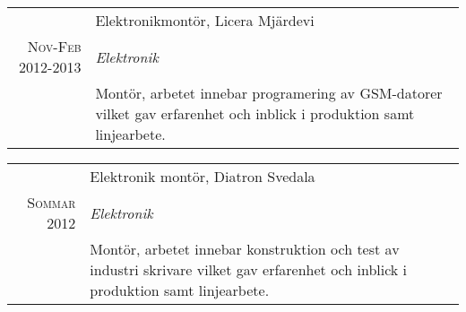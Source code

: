 \documentclass[a4paper,10pt]{article}
\begin{document}
\begin{tabular}{r|p{11cm}}
    
    & Elektronikmontör, Licera Mjärdevi \\         
    \textsc{Nov-Feb 2012-2013} & \emph{Elektronik}\\
    & \footnotesize{Montör, arbetet innebar programering av GSM-datorer vilket gav erfarenhet och inblick i produktion samt linjearbete.}\\
    
    \end{tabular}
    \newpage
    \begin{tabular}{r|p{11cm}}
    
    & Elektronik montör, Diatron Svedala \\         
    \textsc{Sommar 2012} & \emph{Elektronik}\\
    & \footnotesize{Montör, arbetet innebar konstruktion och test av industri skrivare vilket gav erfarenhet och inblick i produktion samt linjearbete.}\\
    
    
\end{tabular}

\end{document}
